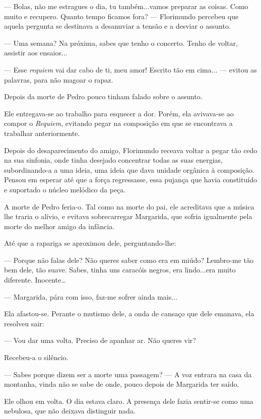 --- Bolas, não me estragues o dia, tu também...vamos preparar as coisas.
Como muito e recupero. Quanto tempo ficamos fora? ---  Florimundo percebeu
que aquela pergunta se destinava a desanuviar a tensão e a desviar o
assunto.

--- Uma semana? Na próxima, sabes que tenho o concerto. Tenho de voltar,
assistir aos ensaios...

--- Esse \emph{requiem }vai dar cabo de ti, meu amor! Escrito tão em
cima... --- evitou as palavras, para não magoar o rapaz.

Depois da morte de Pedro pouco tinham falado sobre o assunto.

Ele entregava-se ao trabalho para esquecer a dor. Porém, ela avivava-se
ao compor o \emph{Requiem}, evitando pegar na composição em que se
encontrava a trabalhar anteriormente.

Depois do desaparecimento do amigo, Florimundo receava voltar a pegar
tão cedo na sua sinfonia, onde tinha desejado concentrar todas as suas
energias, subordinando-a a uma ideia, uma ideia que dava unidade
orgânica à composição. Pensou em esperar até que a força regressasse,
essa pujança que havia constituído e suportado o núcleo melódico da
peça.

A morte de Pedro feria-o. Tal como na morte do pai, ele acreditava que a
música lhe traria o alívio, e evitava sobrecarregar Margarida, que
sofria igualmente pela morte do melhor amigo da infância.

Até que a rapariga se aproximou dele, perguntando-lhe:

--- Porque não falas dele? Não queres saber como era em miúdo? Lembro-me
tão bem dele, tão suave. Sabes, tinha uns caracóis negros, era
lindo...era muito diferente. Inocente\ldots{}

--- Margarida, pára com isso, faz-me sofrer ainda mais...

Ela afastou-se. Perante o mutismo dele, a onda de cansaço que dele
emanava, ela resolveu sair:

--- Vou dar uma volta. Preciso de apanhar ar. Não queres vir?

Recebeu-a o silêncio.

--- Sabes porque dizem ser a morte uma passagem? --- A voz entrara na casa
da montanha, vinda não se sabe de onde, pouco depois de Margarida ter
saído.

Ele olhou em volta. O dia estava claro. A presença dele fazia sentir-se
como uma nebulosa, que não deixava distinguir nada.

